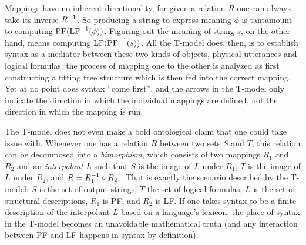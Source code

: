 Mappings have no inherent directionality, for given a relation $R$ one can always take its inverse $R^{-1}$.
So producing a string to express meaning $\phi$ is tantamount to computing $\mathrm{PF}(\mathrm{LF}^{-1}(\phi))$.
Figuring out the meaning of string $s$, on the other hand, means computing $\mathrm{LF}(\mathrm{PF}^{-1}(s))$.
All the T-model does, then, is to establish syntax as a mediator between these two kinds of objects, physical utterances and logical formulas: the process of mapping one to the other is analyzed as first constructing a fitting tree structure which is then fed into the correct mapping.
Yet at no point does syntax ``come first'', and the arrows in the T-model only indicate the direction in which the individual mappings are defined, not the direction in which the mapping is run.

The T-model does not even make a bold ontological claim that one could take issue with.
Whenever one has a relation $R$ between two sets $S$ and $T$, this relation can be decomposed into a \emph{bimorphism}, which consists of two mappings $R_1$ and $R_2$ and an \emph{interpolant} $L$ such that $S$ is the image of $L$ under $R_1$, $T$ is the image of $L$ under $R_2$, and $R = R_1^{-1} \circ R_2$ \citep{ArnoldDauchet82}.
That is exactly the scenario described by the T-model: $S$ is the set of output strings, $T$ the set of logical formulas, $L$ is the set of structural descriptions, $R_1$ is PF, and $R_2$ is LF\@.
If one takes syntax to be a finite description of the interpolant $L$ based on a language's lexicon, the place of syntax in the T-model becomes an unavoidable mathematical truth (and any interaction between PF and LF happens in syntax by definition).

